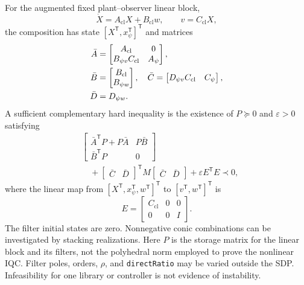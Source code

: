\documentclass[final,5p,twocolumn]{elsarticle}
\theoremstyle{definition}
\theoremstyle{remark}
\newcommand{\T}{\mathsf{T}}
\begin{document}
For the augmented fixed plant--observer linear block,
\begin{equation}\label{eq:plant}
 \dot X=A_{\mathrm{cl}}X+B_{\mathrm{cl}}w,\qquad v=C_{\mathrm{cl}}X,
\end{equation}
the composition has state $[X^{\T},x_\psi^{\T}]^{\T}$ and matrices
\begin{align}
 \bar A&=\begin{bmatrix}A_{\mathrm{cl}}&0\\B_{\psi v}C_{\mathrm{cl}}&A_\psi\end{bmatrix},\notag\\
 \bar B&=\begin{bmatrix}B_{\mathrm{cl}}\\B_{\psi w}\end{bmatrix},\quad
 \bar C=\begin{bmatrix}D_{\psi v}C_{\mathrm{cl}}&C_\psi\end{bmatrix},\notag\\
 \bar D&=D_{\psi w}.\label{eq:augmented}
\end{align}
A sufficient complementary hard inequality is the existence of $P\succeq0$ and $\varepsilon>0$ satisfying
\begin{equation}\label{eq:lmi}
\boxed{\begin{aligned}
 &\begin{bmatrix}\bar A^{\T}P+P\bar A&P\bar B\\\bar B^{\T}P&0\end{bmatrix}\\
 &\quad+\begin{bmatrix}\bar C&\bar D\end{bmatrix}^{\T}M
          \begin{bmatrix}\bar C&\bar D\end{bmatrix}
 +\varepsilon E^{\T}E\prec0,
\end{aligned}}
\end{equation}
where the linear map from $[X^{\T},x_\psi^{\T},w^{\T}]^{\T}$ to $[v^{\T},w^{\T}]^{\T}$ is
\begin{equation}\label{eq:E}
 E=\begin{bmatrix}C_{\mathrm{cl}}&0&0\\0&0&I\end{bmatrix}.
\end{equation}
The filter initial states are zero. Nonnegative conic combinations can be investigated by stacking realizations. Here $P$ is the storage matrix for the linear block and its filters, not the polyhedral norm employed to prove the nonlinear IQC. Filter poles, orders, $\rho$, and \texttt{directRatio} may be varied outside the SDP. Infeasibility for one library or controller is not evidence of instability.
\end{document}
